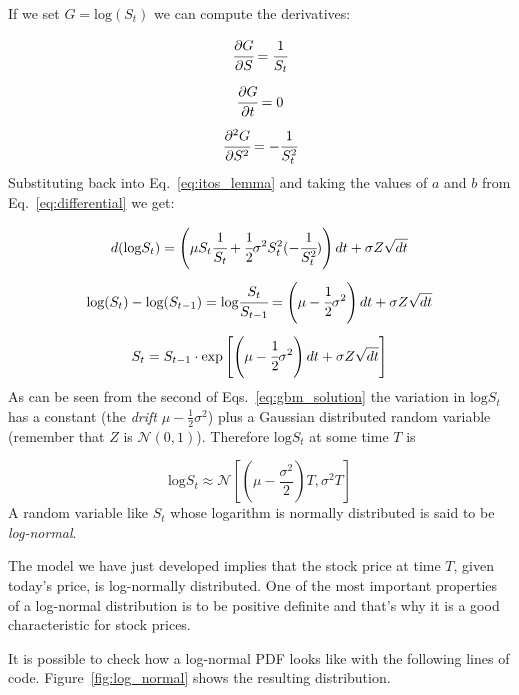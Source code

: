 If we set $G = \textrm{log}(S_t)$ we can compute the derivatives:

\begin{equation}
\begin{gathered}
\cfrac{\partial G}{\partial S} = \cfrac{1}{S_t}\\[5pt]
\cfrac{\partial G}{\partial t} = 0\\[5pt]
\cfrac{\partial^2 G}{\partial S^2} = -\cfrac{1}{S_t^{2}}
\end{gathered}
\end{equation}
Substituting back into Eq.~\ref{eq:itos_lemma} and taking the values of $a$ and $b$ from Eq.~\ref{eq:differential} we get:

\begin{equation}
\begin{gathered}
d(\textrm{log} S_t) = \left(\mu S_t \cfrac{1}{S_t} + \cfrac{1}{2}\sigma^2 S_t^2 (-\cfrac{1}{S_t^2})\right)dt + \sigma Z\sqrt{dt}\\[5pt]
\textrm{log} (S_t) - \textrm{log} (S_{t-1}) = \textrm{log} \cfrac{S_t}{S_{t-1}} = \left(\mu - \cfrac{1}{2}\sigma^2\right)dt + \sigma Z\sqrt{dt}\\[5pt]
S_t = S_{t-1}\cdot\textrm{exp}\left[\left(\mu - \cfrac{1}{2}\sigma^2\right)dt + \sigma Z\sqrt{dt}\right]
\end{gathered}
\label{eq:gbm_solution}
\end{equation}
As can be seen from the second of Eqs.~\ref{eq:gbm_solution} the variation in $\textrm{log} S_t$ has a constant (the \emph{drift} $\mu - \frac{1}{2}\sigma^2$) plus a Gaussian distributed random variable (remember that $Z$ is $\mathcal{N}(0,1)$). Therefore $\textrm{log} S_t$ at some time $T$ is 

\begin{equation}
\textrm{log}S_t \approx\mathcal{N}\left[\left(\mu-\frac{\sigma^2}{2}\right)T, \sigma^2 T\right]
\end{equation}
A random variable like $S_t$ whose logarithm is normally distributed is said to be \emph{log-normal}. 

The model we have just developed implies that the stock price at time $T$, given today's price, is log-normally distributed. One of the most important properties of a log-normal distribution is to be positive definite and that's why it is a good characteristic for stock prices. 

It is possible to check how a log-normal PDF looks like with the following lines of code. Figure~\ref{fig:log_normal} shows the resulting distribution.

